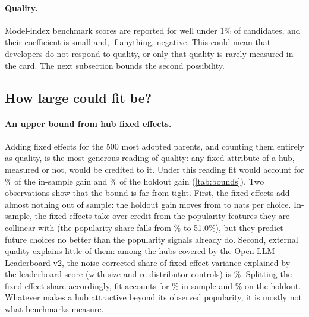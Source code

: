 \paragraph{Quality.}
Model-index benchmark scores are reported for well under 1\% of candidates, and their coefficient is small and, if
anything, negative. This could mean that developers do not respond to quality, or only that quality is rarely
measured in the card. The next subsection bounds the second possibility.



\subsection{How large could fit be?}
\paragraph{An upper bound from hub fixed effects.}
Adding fixed effects for the 500 most adopted parents, and counting them entirely as quality, is the most generous
reading of quality: any fixed attribute of a hub, measured or not, would be credited to it. Under this reading fit
would account for \feInQual\% of the in-sample gain and \feHoldQual\% of the holdout gain (\cref{tab:bounds}). Two
observations show that the bound is far from tight. First, the fixed effects add almost nothing out of sample:
the holdout gain moves from \holdGainNoFE{} to \holdGainFE{} nats per choice. In-sample, the fixed effects take
over credit from the popularity features they are collinear with (the popularity share falls from \shPopularity\%
to 51.0\%), but they predict future choices no better than the popularity signals already do. Second, external
quality explains little of them: among the \extHubs{} hubs covered by the Open LLM Leaderboard v2, the
noise-corrected share of fixed-effect variance explained by the leaderboard score (with size and re-distributor
controls) is \extQ\%. Splitting the fixed-effect share accordingly, fit accounts for \extFitIn\% in-sample and
\extFitHold\% on the holdout. Whatever makes a hub attractive beyond its observed popularity, it is mostly not what
benchmarks measure.

